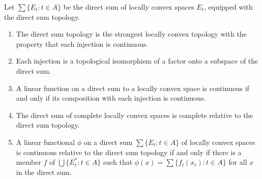 Let $\sum \{E_t : t \in A\}$ be the direct sum of locally convex spaces $E_t$, equipped with the direct sum topology.

\begin{enumerate}
\item[(i)] The direct sum topology is the strongest locally convex topology with the property that each injection is continuous.

\item[(ii)] Each injection is a topological isomorphism of a factor onto a subspace of the direct sum.

\item[(iii)] A linear function on a direct sum to a locally convex space is continuous if and only if its composition with each injection is continuous.

\item[(iv)] The direct sum of complete locally convex spaces is complete relative to the direct sum topology.

\item[(v)] A linear functional $\phi$ on a direct sum $\sum \{E_t : t \in A\}$ of locally convex spaces is continuous relative to the direct sum topology if and only if there is a member $f$ of $\bigcup \{E_t^* : t \in A\}$ such that $\phi(x) = \sum \{f_t(x_t) : t \in A\}$ for all $x$ in the direct sum.
\end{enumerate}
